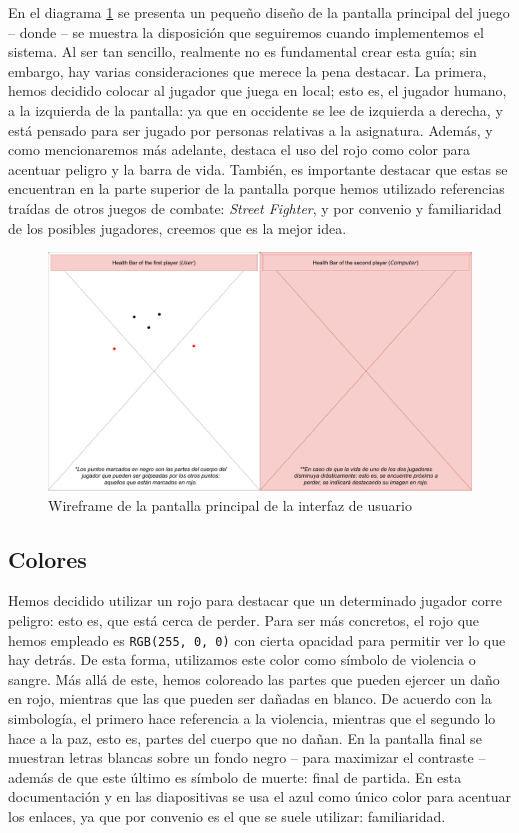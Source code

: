 \documentclass{article}
\begin{document}
En el diagrama \ref{fig:wireframe} se presenta un pequeño diseño de la pantalla principal del juego -- donde -- se muestra la disposición que seguiremos cuando implementemos el sistema. Al ser tan sencillo, realmente no es fundamental crear esta guía; sin embargo, hay varias consideraciones que merece la pena destacar. La primera, hemos decidido colocar al jugador que juega en local; esto es, el jugador humano, a la izquierda de la pantalla: ya que en occidente se lee de izquierda a derecha, y está pensado para ser jugado por personas relativas a la asignatura. Además, y como mencionaremos más adelante, destaca el uso del rojo como color para acentuar peligro y la barra de vida. También, es importante destacar que estas se encuentran en la parte superior de la pantalla porque hemos utilizado referencias traídas de otros juegos de combate: \textit{Street Fighter}, y por convenio y familiaridad de los posibles jugadores, creemos que es la mejor idea.

\begin{figure}[H]
    \centering
    \includegraphics[width=\textwidth]{img/wireframe}
    \caption{Wireframe de la pantalla principal de la interfaz de usuario}
    \label{fig:wireframe}
\end{figure}

\subsection{Colores}

Hemos decidido utilizar un rojo para destacar que un determinado jugador corre peligro: esto es, que está cerca de perder. Para ser más concretos, el rojo que hemos empleado es \texttt{RGB(255, 0, 0)} con cierta opacidad para permitir ver lo que hay detrás. De esta forma, utilizamos este color como símbolo de violencia o sangre. Más allá de este, hemos coloreado las partes que pueden ejercer un daño en rojo, mientras que las que pueden ser dañadas en blanco. De acuerdo con la simbología, el primero hace referencia a la violencia, mientras que el segundo lo hace a la paz, esto es, partes del cuerpo que no dañan. En la pantalla final se muestran letras blancas sobre un fondo negro -- para maximizar el contraste -- además de que este último es símbolo de muerte: final de partida. En esta documentación y en las diapositivas se usa el azul como único color para acentuar los enlaces, ya que por convenio es el que se suele utilizar: familiaridad.
\end{document}
